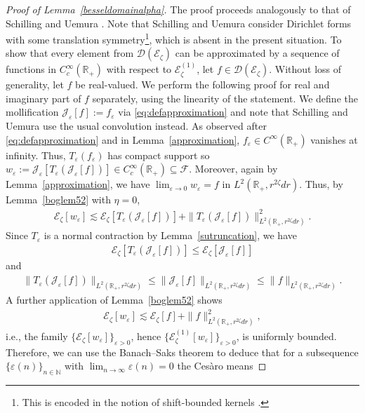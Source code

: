 \documentclass[12pt,reqno]{amsart}
\theoremstyle{definition}
\theoremstyle{remark}
\numberwithin{equation}{section}
\newcommand{\1}{\mathbbm{1}}
\newcommand{\D}{\mathcal{D}}
\renewcommand{\epsilon}{\varepsilon}
\newcommand{\F}{\mathcal{F}}
\newcommand{\N}{\mathbb{N}}
\newcommand{\R}{\mathbb{R}}
\def\ce{\mathcal{E}}
\def\cj{\mathcal{J}}
\begin{document}
\begin{proof}[Proof of Lemma~\ref{besseldomainalpha}]
  The proof proceeds analogously to that of Schilling and Uemura \cite[Theorem~2.4]{SchillingUemura2012}. 
  Note that Schilling and Uemura consider Dirichlet forms with some translation symmetry\footnote{This is encoded in the notion of shift-bounded kernels \cite[Definition~2.1]{SchillingUemura2012}.}, which is absent in the present situation.
  To show that every element from $\D(\ce_\zeta)$ can be approximated by a sequence of functions in $C_c^\infty(\R_+)$ with respect to $\ce_\zeta^{(1)}$, let $f\in\D(\ce_\zeta)$. Without loss of generality, let $f$ be real-valued. We perform the following proof for real and imaginary part of $f$ separately, using the linearity of the statement. We define the mollification $\cj_\epsilon[f]:=f_\epsilon$ via \eqref{eq:defapproximation} and note that Schilling and Uemura use the usual convolution instead.
  As observed after \eqref{eq:defapproximation} and in Lemma~\ref{approximation}, $f_\epsilon\in C^\infty(\R_+)$ vanishes at infinity. Thus, $T_\epsilon(f_\epsilon)$ has compact support so $w_\epsilon:=\cj_\epsilon[T_\epsilon(\cj_\epsilon[f])]\in C_c^\infty(\R_+)\subseteq\F$. Moreover, again by Lemma~\ref{approximation}, we have $\lim_{\epsilon\to0}w_\epsilon=f$ in $L^2(\R_+,r^{2\zeta}dr)$. Thus, by Lemma~\ref{boglem52} with $\eta=0$,
  \begin{align*}
    \ce_\zeta[w_\epsilon] \lesssim \ce_\zeta[T_\epsilon(\cj_\epsilon[f])] + \|T_\epsilon(\cj_\epsilon[f])\|_{L^2(\R_+,r^{2\zeta}dr)}^2.
  \end{align*}
  Since $T_\epsilon$ is a normal contraction by Lemma~\ref{sutruncation}, we have
  \begin{align*}
    \ce_\zeta[T_\epsilon(\cj_\epsilon[f])] \leq \ce_\zeta[\cj_\epsilon[f]]
  \end{align*}
  and
  \begin{align*}
    \|T_\epsilon(\cj_\epsilon[f])\|_{L^2(\R_+,r^{2\zeta}dr)}
    \leq \|\cj_\epsilon[f]\|_{L^2(\R_+,r^{2\zeta}dr)}
    \leq \|f\|_{L^2(\R_+,r^{2\zeta}dr)}.
  \end{align*}
  A further application of Lemma~\ref{boglem52} shows
  \begin{align*}
    \ce_\zeta[w_\epsilon]
    \lesssim \ce_\zeta[f] + \|f\|_{L^2(\R_+,r^{2\zeta}dr)}^2,
  \end{align*}
  i.e., the family $\{\ce_\zeta[w_\epsilon]\}_{\epsilon>0}$, hence $\{\ce_\zeta^{(1)}[w_\epsilon]\}_{\epsilon>0}$, is uniformly bounded. Therefore, we can use the Banach--Saks theorem to deduce that for a subsequence $\{\epsilon(n)\}_{n\in\N}$ with $\lim_{n\to\infty}\epsilon(n)=0$ the Cesàro means

\end{proof}
\end{document}
